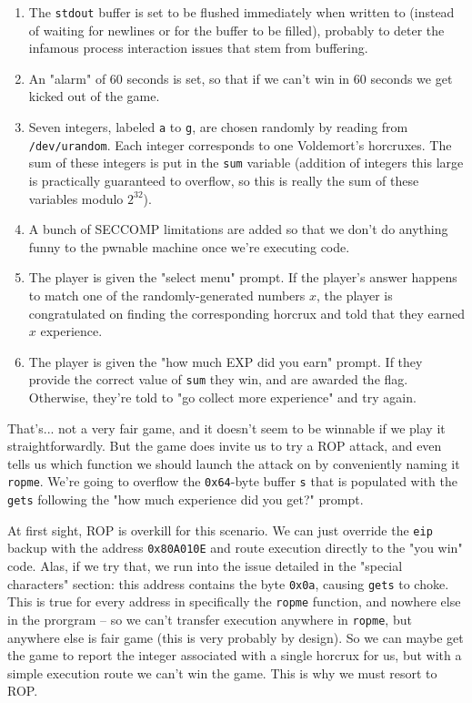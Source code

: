 \documentclass{article}
\newcommand{\xcode}[2]{\colorbox{ubuntuback}{\lstinline[language=#1]|#2|}}
\newcommand{\asm}[1]{\xcode{{[x86masm]assembler}}{#1}}
\newcommand{\code}[1]{\colorbox{ubuntuback}{\texttt{#1}}}
\begin{document}
\begin{enumerate}
    \item The \code{stdout} buffer is set to be flushed immediately when written to (instead of waiting for newlines or for the buffer to be filled), probably to deter the infamous process interaction issues that stem from buffering.
    \item An "alarm" of 60 seconds is set, so that if we can't win in 60 seconds we get kicked out of the game.
    \item Seven integers, labeled \xcode{C}{a} to \xcode{C}{g}, are chosen randomly by reading from \xcode{bash}{/dev/urandom}. Each integer corresponds to one Voldemort's horcruxes. The sum of these integers is put in the \xcode{C}{sum} variable (addition of integers this large is practically guaranteed to overflow, so this is really the sum of these variables modulo $2^{32}$).
    \item A bunch of SECCOMP limitations are added so that we don't do anything funny to the pwnable machine once we're executing code.
    \item The player is given the "select menu" prompt. If the player's answer happens to match one of the randomly-generated numbers $x$, the player is congratulated on finding the corresponding horcrux and told that they earned $x$ experience.
    \item The player is given the "how much EXP did you earn" prompt. If they provide the correct value of \xcode{C}{sum} they win, and are awarded the flag. Otherwise, they're told to "go collect more experience" and try again.
\end{enumerate}

That's... not a very fair game, and it doesn't seem to be winnable if we play it straightforwardly. But the game does invite us to try a ROP attack, and even tells us which function we should launch the attack on by conveniently naming it \xcode{C}{ropme}. We're going to overflow the \code{0x64}-byte buffer \xcode{C}{s} that is populated with the \xcode{C}{gets} following the "how much experience did you get?" prompt.

At first sight, ROP is overkill for this scenario. We can just override the \asm{eip} backup with the address \code{0x80A010E} and route execution directly to the "you win" code. Alas, if we try that, we run into the issue detailed in the "special characters" section: this address contains the byte \code{0x0a}, causing \xcode{C}{gets} to choke. This is true for every address in specifically the \xcode{C}{ropme} function, and nowhere else in the prorgram -- so we can't transfer execution anywhere in \xcode{C}{ropme}, but anywhere else is fair game (this is very probably by design). So we can maybe get the game to report the integer associated with a single horcrux for us, but with a simple execution route we can't win the game. This is why we must resort to ROP.
\end{document}
